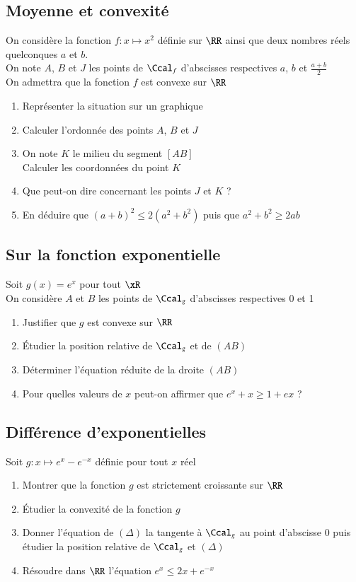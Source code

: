 \documentclass[oneside,12pt]{article}          %
\begin{document}
\subsection{Moyenne et convexité}
On considère la fonction $f:x\mapsto x^2$ définie sur $\RR$ ainsi que deux nombres réels quelconques $a$ et $b$. \\
On note $A$, $B$ et $J$ les points de $\Ccal_f$ d'abscisses respectives $a$, $b$ et $\frac{a+b}{2}$\\
On admettra que la fonction $f$ est convexe sur $\RR$
\begin{enumerate}
    \item Représenter la situation sur un graphique
    \item Calculer l'ordonnée des points $A$, $B$ et $J$
    \item On note $K$ le milieu du segment $[AB]$\\
    Calculer les coordonnées du point $K$
    \item Que peut-on dire concernant les points $J$ et $K$ ?
    \item En déduire que $(a+b)^2\leq2(a^2+b^2)$ puis que $a^2+b^2\geq2ab$
\end{enumerate}



\subsection{Sur la fonction exponentielle}
Soit $g(x)=e^x$ pour tout $\xR$\\
On considère $A$ et $B$ les points de $\Ccal_g$ d'abscisses respectives 0 et 1
\begin{enumerate}
	\item Justifier que $g$ est convexe sur $\RR$
    \item Étudier la position relative de $\Ccal_g$ et de $(AB)$
    \item Déterminer l'équation réduite de la droite $(AB)$
    \item Pour quelles valeurs de $x$ peut-on affirmer que $e^x+x\geq1+ex$ ?
\end{enumerate}



\subsection{Différence d'exponentielles}
Soit $g:x\mapsto e^x-e^{-x}$ définie pour tout $x$ réel
\begin{enumerate}
    \item Montrer que la fonction $g$ est strictement croissante sur $\RR$
    \item Étudier la convexité de la fonction $g$
    \item Donner l'équation de $(\Delta)$ la tangente à $\Ccal_g$ au point d'abscisse 0 puis étudier la position relative de $\Ccal_g$ et $(\Delta)$
    \item Résoudre dans $\RR$ l'équation $e^x\leq2x+e^{-x}$
\end{enumerate}
\end{document}
